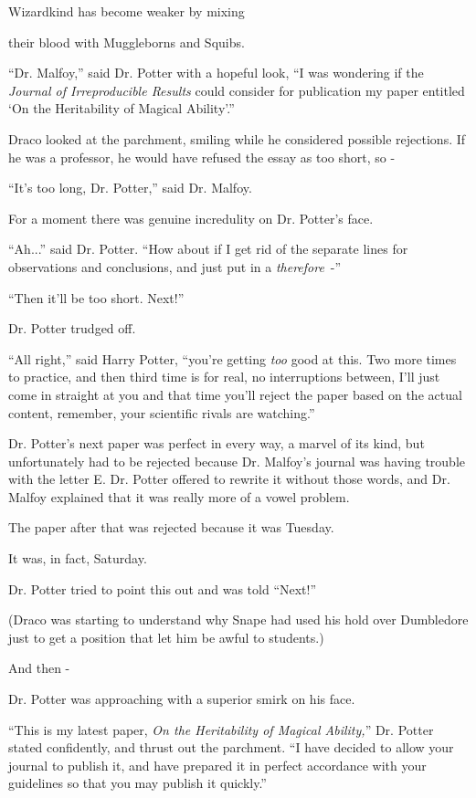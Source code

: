 Wizardkind has become weaker by mixing

their blood with Muggleborns and Squibs.

``Dr. Malfoy,'' said Dr. Potter with a hopeful look, ``I was wondering if the \emph{Journal of Irreproducible Results} could consider for publication my paper entitled `On the Heritability of Magical Ability'.''

Draco looked at the parchment, smiling while he considered possible rejections. If he was a professor, he would have refused the essay as too short, so -

``It's too long, Dr. Potter,'' said Dr. Malfoy.

For a moment there was genuine incredulity on Dr. Potter's face.

``Ah...'' said Dr. Potter. ``How about if I get rid of the separate lines for observations and conclusions, and just put in a \emph{therefore}~-''

``Then it'll be too short. Next!''

Dr. Potter trudged off.

``All right,'' said Harry Potter, ``you're getting \emph{too} good at this. Two more times to practice, and then third time is for real, no interruptions between, I'll just come in straight at you and that time you'll reject the paper based on the actual content, remember, your scientific rivals are watching.''

Dr. Potter's next paper was perfect in every way, a marvel of its kind, but unfortunately had to be rejected because Dr. Malfoy's journal was having trouble with the letter E. Dr. Potter offered to rewrite it without those words, and Dr. Malfoy explained that it was really more of a vowel problem.

The paper after that was rejected because it was Tuesday.

It was, in fact, Saturday.

Dr. Potter tried to point this out and was told ``Next!''

(Draco was starting to understand why Snape had used his hold over Dumbledore just to get a position that let him be awful to students.)

And then -

Dr. Potter was approaching with a superior smirk on his face.

``This is my latest paper, \emph{On the Heritability of Magical Ability,}'' Dr. Potter stated confidently, and thrust out the parchment. ``I have decided to allow your journal to publish it, and have prepared it in perfect accordance with your guidelines so that you may publish it quickly.''


